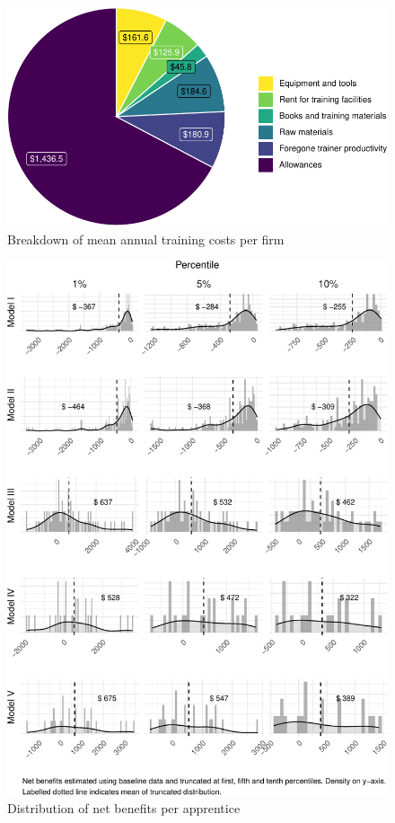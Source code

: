\documentclass[
  a4paper, twoside, 12pt]{book}
\begin{document}
\begin{figure}[H]
\includegraphics{figures/fig-costspie2-1} \caption{Breakdown of mean annual training costs per firm}\label{fig:fig-costspie2}
\end{figure}

\begin{figure}[H]
\includegraphics[width=1\linewidth,]{figures/fig-apphist-1} \caption{Distribution of net benefits per apprentice}\label{fig:fig-apphist}
\end{figure}
\end{document}
